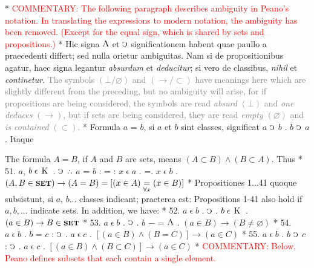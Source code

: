 \documentclass{book}
\newcommand{\C}{\mathop{\sbox0{$\displaystyle$$\reflectbox{C}$} %
\raisebox{-\height+\ht0-0.05cm}[\ht0][\dp0]{\scalebox{0.8}[0.8]{\copy0}}}\displaylimits} %
\newcommand{\pppNoSpace}{\leavevmode\lower0ex\hbox{.}\kern-0.1em\raise0.7ex\hbox{.}\kern-0.1em\lower0ex\hbox{.}} %
\newcommand{\abs}{\mathop{\rotatebox[origin=c]{180}{V}}}
\newcommand{\smallIn}{\ensuremath{\mathrel{\epsilon}}}
\newcommand{\K}{\mathop{\thinspace \text{K} \thinspace}}
\newcommand{\setOfSets}{\mathord{\text{{\footnotesize \textbf{SET}}}}}
\newcommand\irrelavent[1]{\textcolor{gray}{#1}}
\newcommand\commentary[1]{\textcolor{red}{COMMENTARY: #1}}
\newenvironment{translateTwoCol}
               { %
                 \columnratio{0.5, 0.5} \begin{paracol}{2}
                 \newcommand{\LAT}{\switchcolumn[0]*}
                 \newcommand{\ENG}{\switchcolumn[1]}
               }
               { %
                 \let\ENG\undefined
                 \let\LAT\undefined
                 \end{paracol}
               }
\begin{document}
\begin{translateTwoCol}
\LAT
\ENG
\commentary{The following paragraph describes ambiguity in Peano's notation.  In translating the expressions to modern notation, the ambiguity has been removed.  (Except for the equal sign, which is shared by sets and propositions.) }
\LAT
Hic signa $\abs$ et $\C$ significationem habent quae paullo a praecedenti differt; sed nulla orietur ambiguitas. Nam si de propositionibus agatur, haec signa legantur \emph{absurdum} et \emph{deducitur}; si vero de classibus, \emph{nihil} et \emph{continetur}.
\ENG
\irrelavent{The symbols $(\bot / \varnothing)$ and $(\rightarrow / \subset)$ have meanings here which are slightly different from the preceding, but no ambiguity will arise, for if propositions are being considered, the symbols are read \emph{absurd} $(\bot)$ and \emph{one deduces} $(\rightarrow)$, but if sets are being considered, they are read \emph{empty} $(\varnothing)$ and \emph{is contained} $(\subset)$.}
\LAT
\quad Formula $a$ = $b$, si $a$ et $b$ sint classes, significat $a$ $\C$ $b$ . $b$ $\C$ $a$. Itaque
\ENG
\raggedright
\quad The formula $A = B$, if $A$ and $B$ are sets, means $(A \subset B) \wedge (B \subset A)$. Thus
\LAT
51. \hspace{0.67cm} $a$, $b \smallIn \K$ . $\C$ $\pppNoSpace$ $a$ = $b$ : = : $x \smallIn a$ . =\scalebox{0.7}{$x$}\thinspace . $x \smallIn b$
\ENG
51. \hspace{0.67cm} $(A, B \in \setOfSets) \rightarrow (A = B) = [(x \in A) \underset{\forall x}=  (x \in B)]$
\LAT
Propositiones 1...41 quoque subsistunt, si $a$, $b$... classes indicant; praeterea est:
\ENG
Propositions 1-41 also hold if $a,b,...$ indicate sets. In addition, we have:
\LAT
52. \hspace{0.67cm} $a\smallIn b$ . $\C$ . $b \smallIn \K$
\ENG
52. \hspace{0.67cm} $(a \in B) \rightarrow B \in \setOfSets$
\LAT
53. \hspace{0.67cm} $a\smallIn b$ . $\C$ . $b$ $-$ = $\abs$
\ENG
53. \hspace{0.67cm} $(a \in B) \rightarrow (B \not= \varnothing)$
\LAT
54. \hspace{0.67cm} $a \smallIn b$ . $b$ = $c$ : $\C$ . $a \smallIn c$
\ENG
54. \hspace{0.67cm} $[(a \in B) \wedge (B = C)] \rightarrow (a \in C)$
\LAT
55. \hspace{0.67cm} $a \smallIn b$ . $b$ $\C$ $c$ : $\C$ . $a \smallIn c$
\ENG
55. \hspace{0.67cm} $[(a \in B) \wedge (B \subset C)] \rightarrow (a \in C)$
\LAT
\ENG
\commentary{Below, Peano defines subsets that each contain a single element.}

\end{translateTwoCol}
\end{document}
